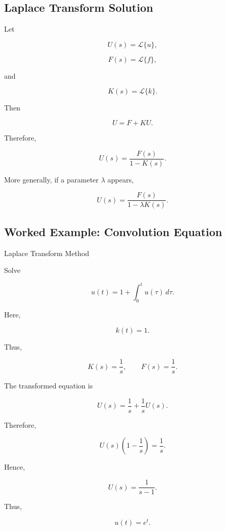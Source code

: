 \subsection{Laplace Transform Solution}
\label{subsec:laplace-integral-equation-solution}

Let

\[
U(s)
=
\mathcal{L}\{u\},
\]

\[
F(s)
=
\mathcal{L}\{f\},
\]

and

\[
K(s)
=
\mathcal{L}\{k\}.
\]

Then

\[
U
=
F+KU.
\]

Therefore,

\[
\boxed{
U(s)
=
\frac{
F(s)
}{
1-K(s)
}.
}
\]

More generally, if a parameter \(\lambda\) appears,

\[
\boxed{
U(s)
=
\frac{
F(s)
}{
1-\lambda K(s)
}.
}
\]

\subsection{Worked Example: Convolution Equation}
\label{subsec:worked-convolution-integral-equation}

\begin{workedexamplebox}{Laplace Transform Method}

Solve

\[
u(t)
=
1
+
\int_0^t
u(\tau)\,d\tau.
\]

Here,

\[
k(t)=1.
\]

Thus,

\[
K(s)=\frac1s,
\qquad
F(s)=\frac1s.
\]

The transformed equation is

\[
U(s)
=
\frac1s
+
\frac1sU(s).
\]

Therefore,

\[
U(s)
\left(
1-\frac1s
\right)
=
\frac1s.
\]

Hence,

\[
U(s)
=
\frac1{s-1}.
\]

Thus,

\begin{answerbox}
\[
\boxed{
u(t)=e^t.
}
\]
\end{answerbox}

\end{workedexamplebox}

